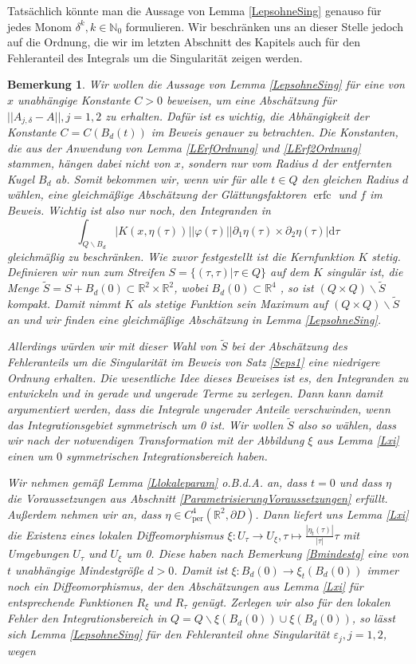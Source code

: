 \documentclass[12pt,a4paper]{scrartcl}
\newtheorem{Bemerkung}[Satz]{Bemerkung}
\newcommand{\dd}{\mathrm{d}}
\numberwithin{equation}{section}
\newcommand{\R}{\mathbb{R}} %
\newcommand{\N}{\mathbb{N}} %
\newcommand{\per}{\operatorname{per}}
\newcommand{\erfc}{\operatorname{erfc}}
\begin{document}
Tatsächlich könnte man die Aussage von Lemma \ref{LepsohneSing} genauso für jedes Monom $\delta^k, k \in \N_0$ formulieren. Wir beschränken uns an dieser Stelle jedoch auf die Ordnung, die wir  im letzten Abschnitt des Kapitels auch für den Fehleranteil des Integrals um die Singularität zeigen werden.
\begin{Bemerkung} \label{BQZerlegung}
Wir wollen die Aussage von Lemma \ref{LepsohneSing} für eine von $x$ unabhängige Konstante $C>0$ beweisen, um eine Abschätzung für $||A_{j,\delta}-A||, j=1,2$ zu erhalten. Dafür ist es wichtig, die Abhängigkeit der Konstante $C=C(B_d(t))$ im Beweis genauer zu betrachten. Die Konstanten, die aus der Anwendung von Lemma \ref{LErfOrdnung} und \ref{LErf2Ordnung} stammen, hängen dabei nicht von $x$, sondern nur vom Radius $d$ der entfernten Kugel $B_d$ ab.
Somit bekommen wir, wenn wir für alle $t \in Q$ den gleichen Radius $d$ wählen, eine gleichmäßige Abschätzung der Glättungsfaktoren $\erfc$ und $f$ im Beweis. Wichtig ist also nur noch, den Integranden in 
\[
\int_{Q \backslash B_d}| K(x,\eta(\tau))||\varphi(\tau)||\partial_1 \eta (\tau) \times \partial_2 \eta(\tau)| \dd \tau 
\]
gleichmäßig zu beschränken. Wie zuvor festgestellt ist die Kernfunktion $K$ stetig. 
Definieren wir nun zum Streifen $S=\{(\tau,\tau)| \tau \in Q \}$ auf dem $K$ singulär ist, die Menge $\widetilde S = S+ B_d(0) \subset \R^2 \times \R^2$, wobei $B_d(0) \subset \R^4$ , so ist $(Q \times Q)\backslash \widetilde S$ kompakt. Damit nimmt $K$ als stetige Funktion sein Maximum auf $(Q \times Q) \backslash \widetilde S$ an und wir finden eine gleichmäßige Abschätzung in Lemma \ref{LepsohneSing}. 

Allerdings würden wir mit dieser Wahl von $\widetilde S$ bei der Abschätzung des Fehleranteils um die Singularität im Beweis von Satz \ref{Seps1} eine niedrigere Ordnung erhalten. Die wesentliche Idee dieses Beweises ist es, den Integranden zu entwickeln und in gerade und ungerade Terme zu zerlegen. Dann kann damit argumentiert werden, dass die Integrale ungerader Anteile verschwinden, wenn das Integrationsgebiet symmetrisch um 0 ist. Wir wollen $\widetilde S$ also so wählen, dass wir nach der notwendigen Transformation mit der Abbildung $\xi$ aus Lemma \ref{Lxi} einen um $0$ symmetrischen Integrationsbereich haben. 

Wir nehmen gemäß Lemma \ref{Llokaleparam} o.B.d.A. an, dass $t=0$ und dass $\eta$ die Voraussetzungen aus Abschnitt \ref{ParametrisierungVoraussetzungen} erfüllt. Außerdem nehmen wir an, dass $\eta \in C_{\per}^4(\R^2,\partial D)$. Dann liefert uns Lemma \ref{Lxi} die Existenz eines lokalen Diffeomorphismus $\xi : U_\tau \to U_\xi, \tau \mapsto \frac{|\eta_t(\tau)|}{|\tau|}\tau$ mit Umgebungen $U_\tau$ und $U_\xi$ um 0. Diese haben nach Bemerkung \ref{Bmindestg} eine von $t$ unabhängige Mindestgröße $d>0$. Damit ist $\xi: B_d(0) \to \xi_t(B_d(0))$ immer noch ein Diffeomorphismus, der den Abschätzungen aus Lemma \ref{Lxi} für entsprechende Funktionen $R_\xi$ und $R_\tau$ genügt. 
Zerlegen wir also für den lokalen Fehler den Integrationsbereich in $Q= Q \backslash \xi(B_d(0)) \cup \xi(B_d(0))$, so lässt sich Lemma \ref{LepsohneSing} für den Fehleranteil ohne Singularität $\varepsilon_j, j=1,2$, wegen


\end{Bemerkung}
\end{document}
